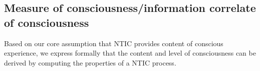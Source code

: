 \rlend
% 
% 
% 
		\subsection{Measure of consciousness/information correlate of consciousness}	
		Based on our core assumption that NTIC provides content of conscious experience, we express formally that the content and level of consciousness can be derived by computing the properties of a NTIC process. 
		
